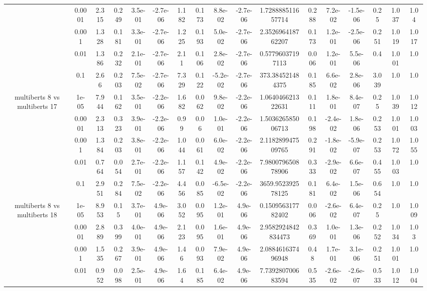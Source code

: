 \begin{tabular}{|c|c|c|c|c|c|c|c|c|c|c|c|c|c|c|c|c|}
 & 0.0001 & 2.315 & 0.249 & 3.5e-01 & -2.7e-06 & 1.182 & 0.173 & 8.8e-02 & -2.7e-06 & 1.728888511657714 & 0.288 & 7.2e-02 & -1.5e-06 & 0.25 & 1.037 & 1.04 \\
 & 0.001 & 1.328 & 0.181 & 3.3e-01 & -2.7e-06 & 1.225 & 0.193 & 5.0e-02 & -2.7e-06 & 2.352696418762207 & 0.173 & 1.2e-01 & -2.5e-06 & 0.251 & 1.019 & 1.017 \\
 & 0.01 & 1.386 & 0.232 & 2.1e-01 & -2.7e-06 & 2.11 & 0.106 & 2.8e-02 & -2.7e-06 & 0.57796037197113 & 0.006 & 1.2e-01 & 5.5e-06 & 0.4 & 1.001 & 1.0 \\
 & 0.1 & 2.66 & 0.203 & 7.5e-02 & -2.7e-06 & 7.329 & 0.122 & -5.2e-02 & -2.7e-06 & 373.384521484375 & 0.185 & 6.6e-02 & 2.8e-06 & 3.039 & 1.0 & 1.0 \\
\hline
\multirow{5}{*}{multiberts 8 vs multiberts 17} & 1e-05 & 7.944 & 0.162 & 3.5e-01 & -2.2e-06 & 1.682 & 0.062 & 9.8e-02 & -2.2e-06 & 1.064046621322631 & 0.111 & 1.8e-01 & 8.4e-07 & 0.25 & 1.039 & 1.012 \\
 & 0.0001 & 2.313 & 0.323 & 3.9e-01 & -2.2e-06 & 0.99 & 0.06 & 1.0e-01 & -2.2e-06 & 1.503626585006713 & 0.198 & -2.4e-02 & 1.8e-06 & 0.253 & 1.001 & 1.003 \\
 & 0.001 & 1.384 & 0.203 & 3.8e-01 & -2.2e-06 & 1.044 & 0.061 & 6.0e-02 & -2.2e-06 & 2.118289947509765 & 0.291 & -1.8e-02 & -5.9e-07 & 0.253 & 1.072 & 1.055 \\
 & 0.01 & 0.764 & 0.054 & 2.7e-01 & -2.2e-06 & 1.157 & 0.142 & 4.9e-02 & -2.2e-06 & 7.980079650878906 & 0.333 & -2.9e-02 & 6.6e-07 & 0.455 & 1.003 & 1.0 \\
 & 0.1 & 2.951 & 0.284 & 7.5e-02 & -2.2e-06 & 4.456 & 0.085 & -6.5e-02 & -2.2e-06 & 3659.952392578125 & 0.181 & 6.4e-02 & 1.5e-06 & 0.654 & 1.0 & 1.0 \\
\hline
\multirow{5}{*}{multiberts 8 vs multiberts 18} & 1e-05 & 8.953 & 0.15 & 3.7e-01 & 4.9e-06 & 3.052 & 0.095 & 1.2e-01 & 4.9e-06 & 0.150956317782402 & 0.006 & -2.6e-02 & 6.4e-07 & 0.25 & 1.0 & 1.009 \\
 & 0.0001 & 2.889 & 0.399 & 4.0e-01 & 4.9e-06 & 2.123 & 0.095 & 1.6e-01 & 4.9e-06 & 2.9582924842834473 & 0.369 & 1.0e-01 & 1.3e-06 & 0.252 & 1.034 & 1.03 \\
 & 0.001 & 1.535 & 0.267 & 3.9e-01 & 4.9e-06 & 1.46 & 0.093 & 7.9e-02 & 4.9e-06 & 2.088461637496948 & 0.48 & 1.7e-01 & 3.1e-06 & 0.251 & 1.001 & 1.0 \\
 & 0.01 & 0.952 & 0.098 & 2.5e-01 & 4.9e-06 & 1.64 & 0.185 & 6.4e-02 & 4.9e-06 & 7.739280700683594 & 0.535 & -2.6e-02 & -2.6e-07 & 0.533 & 1.012 & 1.004 \\

\end{tabular}
